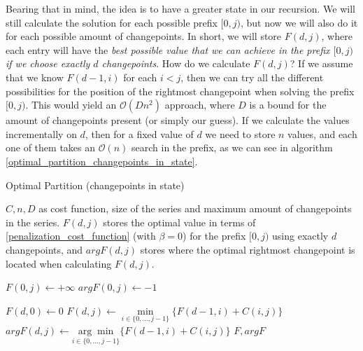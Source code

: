 \documentclass[pdflatex,sn-mathphys]{sn-jnl}%
\theoremstyle{thmstyleone}%
\theoremstyle{thmstyletwo}%
\theoremstyle{thmstylethree}%
\begin{document}
Bearing that in mind, the idea is to have a greater state in our recursion. We will still calculate the solution for each possible prefix $[0,j)$, but now we will also do it for each possible amount of changepoints. In short, we will store $F(d,j)$, where each entry will have the \textit{best possible value that we can achieve in the prefix $[0,j)$ if we choose exactly $d$ changepoints}. How do we calculate $F(d,j)$? If we assume that we know $F(d-1,i)$ for each $i < j$, then we can try all the different possibilities for the position of the rightmost changepoint when solving the prefix $[0,j)$. This would yield an $\mathcal{O}(Dn^2)$ approach, where $D$ is a bound for the amount of changepoints present (or simply our guess). If we calculate the values incrementally on $d$, then for a fixed value of $d$ we need to store $n$ values, and each one of them takes an $\mathcal{O}(n)$ search in the prefix, as we can see in algorithm \ref{optimal_partition_changepoints_in_state}.

\begin{algorithm}[H]
\caption{Optimal Partition (changepoints in state)}\label{optimal_partition_changepoints_in_state}
\begin{algorithmic}[1]
\Require $C, n, D$ as cost function, size of the series and maximum amount of changepoints in the series. 
\Ensure $F(d,j)$ stores the optimal value in terms of \ref{penalization_cost_function} (with $\beta = 0$) for the prefix $[0,j)$ using exactly $d$ changepoints, and $argF(d,j)$ stores where the optimal rightmost changepoint is located when calculating $F(d,j)$. 

    \State $F(0,j) \leftarrow +\infty$
    \State $argF(0,j) \leftarrow -1$
    
\EndFor 


 
    \State $F(d,0) \leftarrow 0$ 
     
    \State $F(d,j) \leftarrow \underset{i \in \{0, \dots, j-1\}}{\min} \{ F(d-1,i) + C(i,j)\}$ 
  \State $argF(d,j)\leftarrow \underset{i \in \{0, \dots, j-1\}}{\arg \min} \{ F(d-1,i) + C(i,j)\}$ 
    \EndFor
\EndFor
\State \Return $F, argF$
\end{algorithmic}
\end{algorithm}
\end{document}
